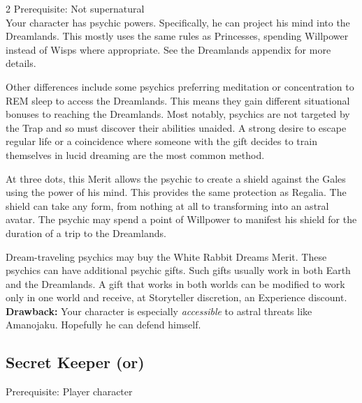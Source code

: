 \begin{multicols}{2}
Prerequisite: Not supernatural\\

\noindent Your character has psychic powers. Specifically, he can project his mind into the Dreamlands. This mostly uses the same rules as Princesses, spending Willpower instead of Wisps where appropriate. See the Dreamlands appendix for more details. 

Other differences include some psychics preferring meditation or concentration to REM sleep to access the Dreamlands. This means they gain different situational bonuses to reaching the Dreamlands. Most notably, psychics are not targeted by the Trap and so must discover their abilities unaided. A strong desire to escape regular life or a coincidence where someone with the gift decides to train themselves in lucid dreaming are the most common method. 

At three dots, this Merit allows the psychic to create a shield against the Gales using the power of his mind. This provides the same protection as Regalia. The shield can take any form, from nothing at all to transforming into an astral avatar. The psychic may spend a point of Willpower to manifest his shield for the duration of a trip to the Dreamlands. 

Dream-traveling psychics may buy the White Rabbit Dreams Merit. These psychics can have additional psychic gifts. Such gifts usually work in both Earth and the Dreamlands. A gift that works in both worlds can be modified to work only in one world and receive, at Storyteller discretion, an Experience discount. \\

\textbf{Drawback:} Your character is especially \textit{accessible} to astral threats like Amanojaku. Hopefully he can defend himself.

\subsection*{Secret Keeper (\textbullet\textbullet\nobreak\hspace{.16667em}or\nobreak\hspace{.16667em}\textbullet\textbullet\textbullet)}

Prerequisite: Player character\\


\end{multicols}
